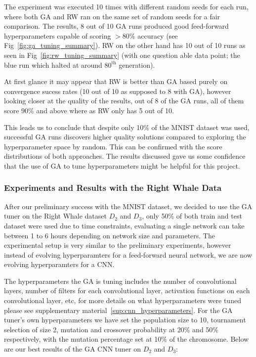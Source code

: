 The experiment was executed 10 times with different random seeds for each run, where both GA and RW ran on the same set of random seeds for a fair comparison. The results, 8 out of 10 GA runs produced good feed-forward hyperparameters capable of scoring $> 80\%$ accuracy (see Fig~\ref{fig:ga_tuning_summary}). RW on the other hand has 10 out of 10 runs as seen in Fig~\ref{fig:rw_tuning_summary} (with one question able data point; the blue run which halted at around $80^{\text{th}}$ generation). 

At first glance it may appear that RW is better than GA based purely on convergence sucess rates (10 out of 10 as supposed to 8 with GA), however looking closer at the quality of the results, out of 8 of the GA runs, all of them score $90\%$ and above where as RW only has 5 out of 10. 

This leads us to conclude that despite only 10\% of the MNIST dataset was used, successful GA runs discovers higher quality solutions compared to exploring the hyperparameter space by random. This can be confirmed with the score distributions of both approaches. The results discussed gave us some confidence that the use of GA to tune hyperparameters might be helpful for this project.



\subsubsection{Experiments and Results with the Right Whale Data}
\label{sec:ga_cnn_tuner}
After our preliminary success with the MNIST dataset, we decided to use the GA tuner on the Right Whale dataset $D_{2}$ and $D_{3}$, only 50\% of both train and test dataset were used due to time constraints, evaluating a single network can take between 1 to 6 hours depending on network size and parameters. The experimental setup is very similar to the preliminary experiments, however instead of evolving hyperparamters for a feed-forward neural network, we are now evolving hyperparamters for a CNN. 

The hyperparameters the GA is tuning includes the number of convolutional layers, number of filters for each convolutional layer, activation functions on each convolutional layer, etc, for more details on what hyperparameters were tuned please see supplementary material~\ref{sup:cnn_hyperparameters}. For the GA tuner's own hyperparameters we have set the population size to 10, tournament selection of size 2, mutation and crossover probability at 20\% and 50\% respectively, with the mutation percentage set at 10\% of the chromosome. Below are our best results of the GA CNN tuner on $D_{2}$ and $D_{3}$:

